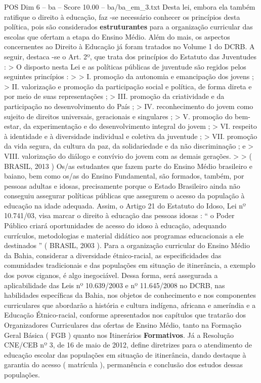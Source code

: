 \begin{textsample}{POS Dim 6 – ba – Score 10.00 – ba/ba\_em\_3.txt}
Desta lei, embora ela também ratifique o direito à educação, faz -se necessário conhecer os princípios desta política, pois são considerados \textbf{estruturantes} para a organização curricular das escolas que ofertam a etapa do Ensino Médio.
Além do mais, os aspectos concernentes ao Direito à Educação já foram tratados no Volume 1 do DCRB.
A seguir, destaca -se o Art. 2º, que trata dos princípios do Estatuto das Juventudes : > O disposto nesta Lei e as políticas públicas de juventude são regidos pelos seguintes princípios : > > I. promoção da autonomia e emancipação dos jovens ; > II. valorização e promoção da participação social e política, de forma direta e por meio de suas representações ; > III. promoção da criatividade e da participação no desenvolvimento do País ; > IV. reconhecimento do jovem como sujeito de direitos universais, geracionais e singulares ; > V. promoção do bem-estar, da experimentação e do desenvolvimento integral do jovem ; > VI. respeito à identidade e à diversidade individual e coletiva da juventude ; > VII. promoção da vida segura, da cultura da paz, da solidariedade e da não discriminação ; e > VIII. valorização do diálogo e convívio do jovem com as demais gerações. > > ( BRASIL, 2013 ) Os/as estudantes que fazem parte do Ensino Médio brasileiro e baiano, bem como os/as do Ensino Fundamental, são formados, também, por pessoas adultas e idosas, precisamente porque o Estado Brasileiro ainda não conseguiu assegurar políticas públicas que assegurem o acesso da população à educação na idade adequada.
Assim, o Artigo 21 do Estatuto do Idoso, Lei nº 10.741/03, visa marcar o direito à educação das pessoas idosas : “ o Poder Público criará oportunidades de acesso do idoso à educação, adequando currículos, metodologias e material didático aos programas educacionais a ele destinados ” ( BRASIL, 2003 ).
Para a organização curricular do Ensino Médio da Bahia, considerar a diversidade étnico-racial, as especificidades das comunidades tradicionais e das populações em situação de itinerância, a exemplo dos povos ciganos, é algo inegociável.
Dessa forma, será assegurada a aplicabilidade das Leis nº 10.639/2003 e nº 11.645/2008 no DCRB, nas habilidades específicas da Bahia, nos objetos de conhecimento e nos componentes curriculares que abordarão a história e cultura indígena, africana e ameríndia e a Educação Étnico-racial, conforme apresentados nos capítulos que tratarão dos Organizadores Curriculares das ofertas de Ensino Médio, tanto na Formação Geral Básica ( FGB ) quanto nos Itinerários \textbf{Formativos}.
Já a Resolução CNE/CEB nº 3, de 16 de maio de 2012, define diretrizes para o atendimento de educação escolar das populações em situação de itinerância, dando destaque à garantia do acesso ( matrícula ), permanência e conclusão dos estudos dessas populações.

\end{textsample}
